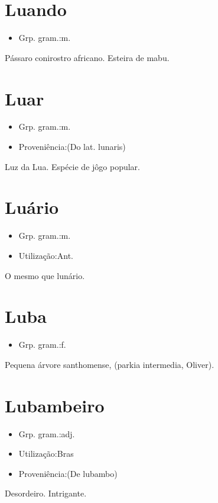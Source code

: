 \section{Luando}
\begin{itemize}
\item {Grp. gram.:m.}
\end{itemize}
Pássaro conirostro africano.
Esteira de mabu.
\section{Luar}
\begin{itemize}
\item {Grp. gram.:m.}
\end{itemize}
\begin{itemize}
\item {Proveniência:(Do lat. \textunderscore lunaris\textunderscore )}
\end{itemize}
Luz da Lua.
Espécie de jôgo popular.
\section{Luário}
\begin{itemize}
\item {Grp. gram.:m.}
\end{itemize}
\begin{itemize}
\item {Utilização:Ant.}
\end{itemize}
O mesmo que \textunderscore lunário\textunderscore .
\section{Luba}
\begin{itemize}
\item {Grp. gram.:f.}
\end{itemize}
Pequena árvore santhomense, (\textunderscore parkia intermedia\textunderscore , Oliver).
\section{Lubambeiro}
\begin{itemize}
\item {Grp. gram.:adj.}
\end{itemize}
\begin{itemize}
\item {Utilização:Bras}
\end{itemize}
\begin{itemize}
\item {Proveniência:(De \textunderscore lubambo\textunderscore )}
\end{itemize}
Desordeiro.
Intrigante.
